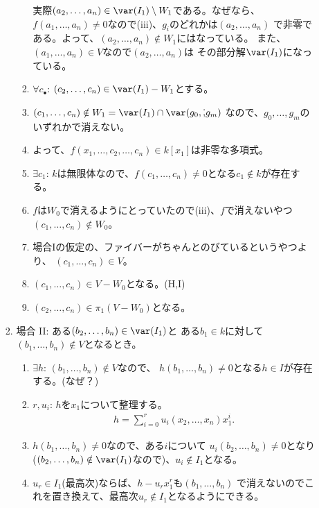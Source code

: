 \begin{enumerate}
\begin{enumerate}
\begin{enumerate}
\begin{enumerate}
        実際$(a_2,\dots,a_n) \in \var(I_1)\setminus W_1$である。なぜなら、
        $f(a_1,\dots,a_n) \neq 0$なので(iii)、$g_i$のどれかは$(a_2,\dots,a_n)$
        で非零である。よって、$(a_2,\dots,a_n)\notin W_1$にはなっている。
        また、$(a_1,\dots,a_n) \in V$なので$(a_2,\dots,a_n)$は
        その部分解$\var(I_1)$になっている。
        \item $\forall c_\bullet$:
        $(c_2,\dots,c_n) \in \var(I_1)-W_1$とする。
        \item
        $(c_1,\dots,c_n)\notin W_1 = \var(I_1)\cap \var(g_0,\dot,g_m)$
        なので、$g_0,\dots,g_m$のいずれかで消えない。
        \item
        よって、$f(x_1,\dots,c_2,\dots,c_n)\in k[x_1]$は非零な多項式。
        \item $\exists c_1$:
        $k$は無限体なので、$f(c_1,\dots,c_n) \neq 0$となる$c_1 \notin k$が存在する。
        \item
        $f$は$W_0$で消えるようにとっていたので(iii)、$f$で消えないやつ$(c_1,\dots,c_n) \notin W_0$。
        \item
        場合Iの仮定の、ファイバーがちゃんとのびているというやつより、
        $(c_1,\dots,c_n) \in V$。
        \item
        $(c_1,\dots,c_n) \in V-W_0$となる。(H,I)
        \item
        $(c_2,\dots,c_n) \in \pi_1(V-W_0)$となる。
      \end{enumerate}
      \item 場合 II: ある$(b_2,\dots,b_n) \in \var(I_1)$と
      ある$b_1 \in k$に対して$(b_1,\dots,b_n) \notin V$となるとき。
      \begin{enumerate}
        \item $\exists h$:
        $(b_1,\dots,b_n)\notin V$なので、
        $h(b_1,\dots,b_n)\neq 0$となる$h\in I$が存在する。(なぜ？)
        \item
        $r,u_i$: $h$を$x_1$について整理する。
        \begin{align}
          h = \sum_{i=0}^r u_i(x_2,\dots,x_n) x_1^i.
        \end{align}
        \item
        $h(b_1,\dots,b_n) \neq 0$なので、ある$i$について
        $u_i(b_2,\dots,b_n) \neq 0$となり($(b_2,\dots,b_n)\notin \var(I_1)$なので)、$u_i \notin I_1$となる。
        \item
        $u_r \in I_1$(最高次)ならば、$h-u_rx_1^r$も$(b_1,\dots,b_n)$
        で消えないのでこれを置き換えて、最高次$u_r\notin I_1$となるようにできる。

\end{enumerate}
\end{enumerate}
\end{enumerate}
\end{enumerate}
